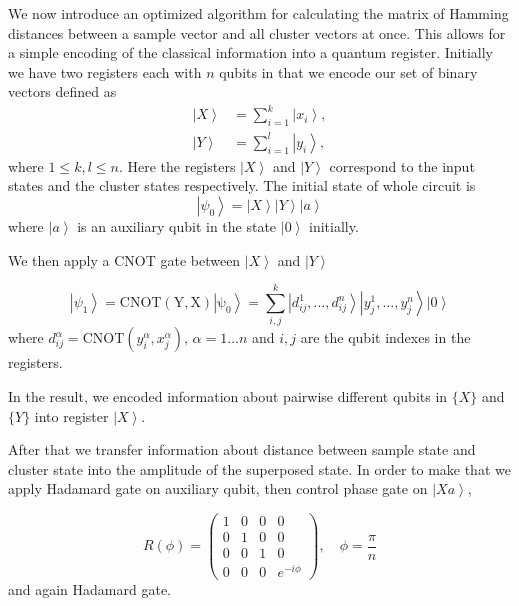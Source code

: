 \documentclass[pra,showkeys,twocolumn,showpacs]{revtex4-1}
\begin{document}
We now introduce an optimized algorithm for calculating the matrix of Hamming distances \cite{trugenberger2001} between a sample vector and all cluster vectors at once.  
This allows for a simple encoding of the classical information into a quantum register. 
Initially we have two registers each with $n$ qubits in that we encode our set of binary vectors defined as
%
\begin{align}
    \label{eq:encodnig}
    \left| X \right\rangle  & = \sum\limits_{i=1}^{k} \left| x_i \right\rangle,  \\
    \left| Y \right\rangle&  = \sum\limits_{i=1}^{l} \left| y_i \right\rangle,
\end{align}
% 
where $ 1 \le k, l \le n $.  
Here the registers $\left| X \right\rangle$ and $\left| Y \right\rangle$ correspond to the input states and the cluster states respectively. 
The initial state of whole circuit is
%
\begin{equation} 
\left| \psi_0 \right\rangle = 
    \left| X \right\rangle
    \left| Y \right\rangle 
    \left| a \right\rangle
    \label{eq:initial_state}
\end{equation}
%
where $\left| a \right\rangle$ is an auxiliary qubit in the state $\left| 0 \right\rangle$ initially.

We then apply a CNOT gate between $\left| X \right\rangle$ and $\left| Y \right\rangle$

\begin{equation}
    \left| \psi_1 \right\rangle = 
    \mathrm{CNOT(Y,X)\left| \psi_0 \right\rangle} =  
    \sum\limits_{i, j}^{k} 
    \left| d^1_{ij}, \dots, d^n_{ij} \right\rangle 
    \left| y^1_j, \dots, y^n_j \right\rangle
    \left| 0 \right\rangle 
\end{equation}
where $d^\alpha_{ij} = \mathrm{CNOT}(y^\alpha_i, x^\alpha_j),\, \alpha = 1 \dots n$ and $i,j$ are the qubit indexes in the registers.

In the result, we encoded information about pairwise different qubits in $\{X\}$ and $\{Y\}$ into register $\left| X \right\rangle$. 


After that we transfer information about distance between sample state and cluster state into the amplitude of the superposed state. 
In order to make that we apply Hadamard gate on auxiliary qubit, then control phase gate on $\left| Xa \right\rangle$,  

\begin{equation}
    \label{eq:control_phase_rotation}
    R(\phi) = 
    \begin{pmatrix}
        1 & 0 & 0 & 0 \\
        0 & 1 & 0 & 0 \\
        0 & 0 & 1 & 0 \\
        0 & 0 & 0 & e^{-i\phi}
    \end{pmatrix},
    \quad \phi = \frac{\pi}{n}
\end{equation}
and again Hadamard gate.
\end{document}
